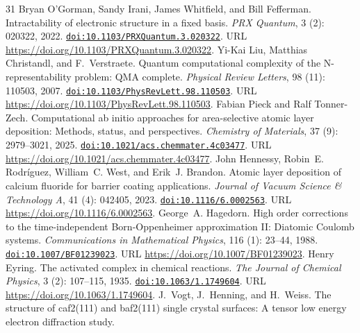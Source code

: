 \documentclass[11pt,a4paper]{article}
\theoremstyle{plain}
\theoremstyle{definition}
\theoremstyle{remark}
\providecommand{\doi}[1]{\href{https://doi.org/#1}{\texttt{doi:#1}}}
\begin{document}
\begin{thebibliography}{31}
Bryan O'Gorman, Sandy Irani, James Whitfield, and Bill Fefferman.
\newblock Intractability of electronic structure in a fixed basis.
\newblock \emph{PRX Quantum}, 3 (2): 020322, 2022.
\newblock \doi{10.1103/PRXQuantum.3.020322}.
\newblock URL \url{https://doi.org/10.1103/PRXQuantum.3.020322}.
Yi-Kai Liu, Matthias Christandl, and F.~Verstraete.
\newblock Quantum computational complexity of the {N}-representability problem:
  {QMA} complete.
\newblock \emph{Physical Review Letters}, 98 (11): 110503,
  2007.
\newblock \doi{10.1103/PhysRevLett.98.110503}.
\newblock URL \url{https://doi.org/10.1103/PhysRevLett.98.110503}.
Fabian Pieck and Ralf Tonner-Zech.
\newblock Computational ab initio approaches for area-selective atomic layer
  deposition: Methods, status, and perspectives.
\newblock \emph{Chemistry of Materials}, 37 (9): 2979--3021,
  2025.
\newblock \doi{10.1021/acs.chemmater.4c03477}.
\newblock URL \url{https://doi.org/10.1021/acs.chemmater.4c03477}.
John Hennessy, Robin~E. Rodríguez, William~C. West, and Erik~J. Brandon.
\newblock Atomic layer deposition of calcium fluoride for barrier coating
  applications.
\newblock \emph{Journal of Vacuum Science \& Technology A}, 41
  (4): 042405, 2023.
\newblock \doi{10.1116/6.0002563}.
\newblock URL \url{https://doi.org/10.1116/6.0002563}.
George~A. Hagedorn.
\newblock High order corrections to the time-independent {Born-Oppenheimer}
  approximation {II}: Diatomic {Coulomb} systems.
\newblock \emph{Communications in Mathematical Physics}, 116
  (1): 23--44, 1988.
\newblock \doi{10.1007/BF01239023}.
\newblock URL \url{https://doi.org/10.1007/BF01239023}.
Henry Eyring.
\newblock The activated complex in chemical reactions.
\newblock \emph{The Journal of Chemical Physics}, 3 (2):
  107--115, 1935.
\newblock \doi{10.1063/1.1749604}.
\newblock URL \url{https://doi.org/10.1063/1.1749604}.
J.~Vogt, J.~Henning, and H.~Weiss.
\newblock The structure of caf2(111) and baf2(111) single crystal surfaces: A
  tensor low energy electron diffraction study.

\end{thebibliography}
\end{document}
